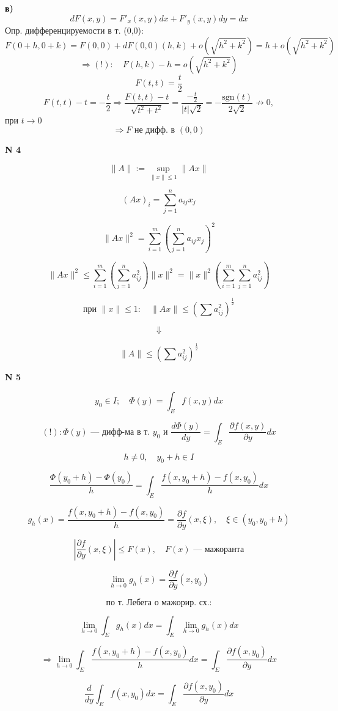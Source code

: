 \documentclass{article}
\begin{document}
\textbf{в)}
\[
dF(x,y) = F'_x(x,y) dx + F'_y(x,y) dy = dx
\]
Опр. дифференцируемости в т. (0,0):
\[
F(0+h, 0+k) = F(0,0) + dF(0,0)(h,k) + o\left(\sqrt{h^2+k^2}\right) = h + o\left(\sqrt{h^2+k^2}\right)
\]
\[
\Rightarrow (!): \quad F(h,k) - h = o\left(\sqrt{h^2+k^2}\right)
\]
\[
F(t,t) = \frac{t}{2}
\]
\[
F(t,t) - t = -\frac{t}{2} \Rightarrow \frac{F(t,t) - t}{\sqrt{t^2+t^2}} = \frac{-\frac{t}{2}}{|t|\sqrt{2}} = -\frac{\text{sgn}(t)}{2\sqrt{2}} \not\to 0,
\]
при \(t \to 0\)
\[
\Rightarrow F \text{ не дифф. в } (0,0)
\]

\vspace{1cm}

\noindent \textbf{N 4}

\[
\|A\| := \sup_{\|x\| \le 1} \|Ax\|
\]

\[
(Ax)_i = \sum_{j=1}^n a_{ij} x_j
\]

\[
\|Ax\|^2 = \sum_{i=1}^m \left( \sum_{j=1}^n a_{ij} x_j \right)^2
\]

\[
\|Ax\|^2 \le \sum_{i=1}^m \left( \sum_{j=1}^n a_{ij}^2 \right) \|x\|^2 = \|x\|^2 \left( \sum_{i=1}^m \sum_{j=1}^n a_{ij}^2 \right)
\]

\[
\text{при } \|x\| \le 1: \quad \|Ax\| \le \left( \sum a_{ij}^2 \right)^{\frac{1}{2}}
\]

\[
\Downarrow
\]

\[
\|A\| \le \left( \sum a_{ij}^2 \right)^{\frac{1}{2}}
\]


\vspace{1cm}

\noindent \textbf{N 5}

\[
y_0 \in I ; \quad \Phi(y) = \int_E f(x,y) dx
\]

\[
(!): \Phi(y) \text{ --- дифф-ма в т. } y_0 \text{ и } \frac{d\Phi(y)}{dy} = \int_E \frac{\partial f(x,y)}{\partial y} dx
\]

\[
h \neq 0, \quad y_0+h \in I
\]

\[
\frac{\Phi(y_0+h) - \Phi(y_0)}{h} = \int_E \frac{f(x, y_0+h) - f(x, y_0)}{h} dx
\]

\[
g_h(x) = \frac{f(x, y_0+h) - f(x, y_0)}{h} = \frac{\partial f}{\partial y}(x, \xi), \quad \xi \in (y_0, y_0+h)
\]

\[
\left| \frac{\partial f}{\partial y}(x, \xi) \right| \le F(x), \quad F(x) \text{ --- мажоранта}
\]

\[
\lim_{h \to 0} g_h(x) = \frac{\partial f}{\partial y}(x, y_0)
\]

\[
\text{по т. Лебега о мажорир. сх.:}
\]

\[
\lim_{h \to 0} \int_E g_h(x) dx = \int_E \lim_{h \to 0} g_h(x) dx
\]

\[
\Rightarrow \lim_{h \to 0} \int_E \frac{f(x, y_0+h) - f(x, y_0)}{h} dx = \int_E \frac{\partial f(x, y_0)}{\partial y} dx
\]

\[
\frac{d}{dy} \int_E f(x, y_0) dx = \int_E \frac{\partial f(x, y_0)}{\partial y} dx
\]
\end{document}
